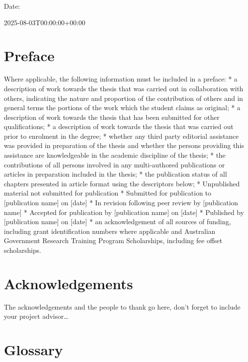 \documentclass{article}
\begin{document}
Date:

2025-08-03T00:00:00+00:00


\chapter{Preface}\label{preface}

Where applicable, the following information must be included in a
preface: * a description of work towards the thesis that was carried out
in collaboration with others, indicating the nature and proportion of
the contribution of others and in general terms the portions of the work
which the student claims as original; * a description of work towards
the thesis that has been submitted for other qualifications; * a
description of work towards the thesis that was carried out prior to
enrolment in the degree; * whether any third party editorial assistance
was provided in preparation of the thesis and whether the persons
providing this assistance are knowledgeable in the academic discipline
of the thesis; * the contributions of all persons involved in any
multi-authored publications or articles in preparation included in the
thesis; * the publication status of all chapters presented in article
format using the descriptors below; * Unpublished material not submitted
for publication * Submitted for publication to {[}publication name{]} on
{[}date{]} * In revision following peer review by {[}publication name{]}
* Accepted for publication by {[}publication name{]} on {[}date{]} *
Published by {[}publication name{]} on {[}date{]} * an acknowledgement
of all sources of funding, including grant identification numbers where
applicable and Australian Government Research Training Program
Scholarships, including fee offset scholarships.


\chapter{Acknowledgements}\label{acknowledgements}

The acknowledgements and the people to thank go here, don't forget to
include your project advisor\ldots{}


\chapter{Glossary}\label{glossary}
\end{document}
